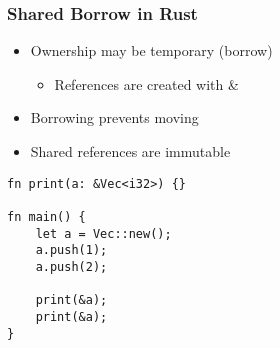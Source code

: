 \documentclass{beamer} %
\begin{document}
\begin{frame}[fragile]
\frametitle{Shared Borrow in Rust}

\begin{itemize}
    \item Ownership may be temporary (borrow)
    \begin{itemize}
    	\item References are created with \&
    \end{itemize}
    \item Borrowing prevents moving
    \item Shared references are immutable
\end{itemize}
    
\begin{lstlisting}
fn print(a: &Vec<i32>) {}

fn main() {
    let a = Vec::new();
    a.push(1);
    a.push(2);
    
    print(&a);
    print(&a);
}    
\end{lstlisting}

\end{frame}


    

    
    

\end{document}
